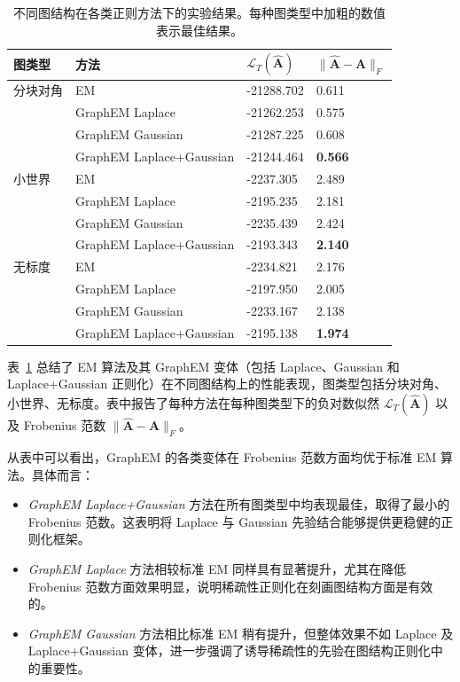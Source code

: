 \documentclass[presentation,aspectratio=169]{ctexbeamer}
\begin{document}
\begin{frame}
\begin{table}[tb]
\centering
\caption{不同图结构在各类正则方法下的实验结果。每种图类型中加粗的数值表示最佳结果。}
\label{tab: prior results for block-diag}
\begin{tabular}{llll}
\toprule
\textbf{图类型} & \textbf{方法} & \textbf{\(\mathcal{L}_T(\widehat{\mathbf{A}})\)} & \textbf{\(\| \widehat{\mathbf{A}} - \mathbf{A} \|_F\)} \\
\midrule
分块对角 & EM & -21288.702 & 0.611 \\
 & GraphEM Laplace & -21262.253 & 0.575 \\
 & GraphEM Gaussian & -21287.225 & 0.608 \\
 & GraphEM Laplace+Gaussian & -21244.464 & \textbf{0.566} \\
小世界 & EM & -2237.305 & 2.489 \\
 & GraphEM Laplace & -2195.235 & 2.181 \\
 & GraphEM Gaussian & -2235.439 & 2.424 \\
 & GraphEM Laplace+Gaussian & -2193.343 & \textbf{2.140} \\
无标度 & EM & -2234.821 & 2.176 \\
 & GraphEM Laplace & -2197.950 & 2.005 \\
 & GraphEM Gaussian & -2233.167 & 2.138 \\
 & GraphEM Laplace+Gaussian & -2195.138 & \textbf{1.974} \\
\bottomrule
\end{tabular}
\end{table}
\end{frame}


\begin{frame}
表~\ref{tab: prior results for block-diag} 总结了 EM 算法及其 GraphEM 变体（包括 Laplace、Gaussian 和 Laplace+Gaussian 正则化）在不同图结构上的性能表现，图类型包括分块对角、小世界、无标度。表中报告了每种方法在每种图类型下的负对数似然 \(\mathcal{L}_T(\widehat{\mathbf{A}})\) 以及 Frobenius 范数 \(\| \widehat{\mathbf{A}} - \mathbf{A} \|_F\)。
\vspace{8pt}
\pause

从表中可以看出，GraphEM 的各类变体在 Frobenius 范数方面均优于标准 EM 算法。具体而言：
\begin{itemize}
    \item \textit{GraphEM Laplace+Gaussian} 方法在所有图类型中均表现最佳，取得了最小的 Frobenius 范数。这表明将 Laplace 与 Gaussian 先验结合能够提供更稳健的正则化框架。
    \item \textit{GraphEM Laplace} 方法相较标准 EM 同样具有显著提升，尤其在降低 Frobenius 范数方面效果明显，说明稀疏性正则化在刻画图结构方面是有效的。
    \item \textit{GraphEM Gaussian} 方法相比标准 EM 稍有提升，但整体效果不如 Laplace 及 Laplace+Gaussian 变体，进一步强调了诱导稀疏性的先验在图结构正则化中的重要性。
\end{itemize}
\end{frame}
\end{document}
